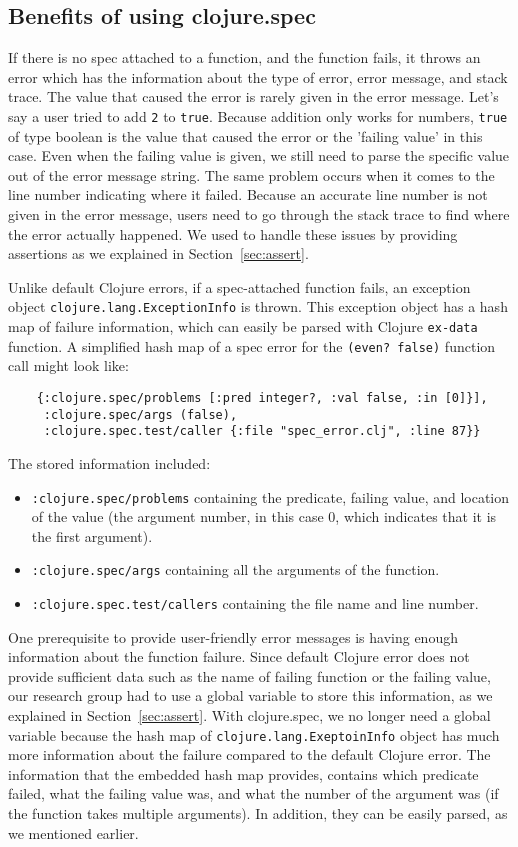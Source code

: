 \documentclass[12pt]{article}
\begin{document}
	\subsection{Benefits of using clojure.spec}
	If there is no spec attached to a function, and the function fails,
	it throws an error which has the information about the type of error, error message, and stack 
	trace. The value that caused the error is rarely given in the error message.
	Let's say a user tried to add {\tt 2} to {\tt true}. Because addition only works for numbers, 
	{\tt true} of type boolean is the value that caused the error or the 'failing value' in this case.
	Even when the failing value is given, we still need to parse the specific value out of 
	the error message string. The same problem occurs when it comes to the line number indicating where it failed. 
	Because an accurate line number is not given in the error message, users need to go through the stack trace to find 
	where the error actually happened. We used to handle these issues by providing assertions as we explained in Section~\ref{sec:assert}.

	Unlike default Clojure errors, if a spec-attached function fails, an exception object 
	\newline	
	{\tt clojure.lang.ExceptionInfo} is thrown. 
	This exception object has a hash map of failure information, which can easily be 
	parsed with Clojure {\tt ex-data} function. A simplified hash map of a spec error 
	for the {\tt (even? false)} function call might look like:
	\begin{verbatim}
	{:clojure.spec/problems [:pred integer?, :val false, :in [0]}], 
	 :clojure.spec/args (false), 
	 :clojure.spec.test/caller {:file "spec_error.clj", :line 87}}
	\end{verbatim}
	The stored information included:
	\begin{itemize}
	\item {\tt :clojure.spec/problems} containing the predicate, failing value, and location of the value 
	(the argument number, in this case 0, which indicates that it is the first argument).
	\item {\tt :clojure.spec/args} containing all the arguments of the function.
	\item {\tt :clojure.spec.test/callers} containing the file name and line number.
	\end{itemize}

	One prerequisite to provide user-friendly error messages is having enough information about the function failure. Since 
	default Clojure error does not provide sufficient data such as the name of failing function or the failing value, our 
	research group had to use a global variable to store this information, as we explained in Section~\ref{sec:assert}. 
	With clojure.spec, we no longer need a global variable because the hash map of {\tt clojure.lang.ExeptoinInfo} object 
	has much more information about the 
	failure compared to the default Clojure error. The information that the embedded hash map provides, contains which predicate 
	failed, what the failing value was, and what the number of the argument was (if the function takes multiple arguments). 
	In addition, they can be easily parsed, as we mentioned earlier. 
	
\end{document}
